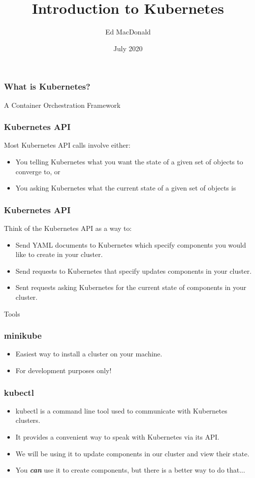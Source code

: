 \documentclass{beamer}
\title[Kubernetes]{Introduction to Kubernetes}
\author{Ed MacDonald}
\institute{Solution Street}
\date{July 2020}
\begin{document}
\frame{\titlepage}

\begin{frame}
\frametitle{What is Kubernetes?}
A Container Orchestration Framework
\end{frame}

\begin{frame}
\frametitle{Kubernetes API}
Most Kubernetes API calls involve either:
\begin{itemize}
    \item You telling Kubernetes what you want the state of a given set of objects to converge to, or
    \item You asking Kubernetes what the current state of a given set of objects is
\end{itemize}
\end{frame}

\begin{frame}
\frametitle{Kubernetes API}
Think of the Kubernetes API as a way to:
\begin{itemize}
    \item Send YAML documents to Kubernetes which specify components you would like to create in your cluster.
    \item Send requests to Kubernetes that specify updates components in your cluster.
    \item Sent requests asking Kubernetes for the current state of components in your cluster.
\end{itemize}
\end{frame}

\begin{frame}
    \begin{center}
        \Huge Tools
    \end{center}
\end{frame}

\begin{frame}
    \frametitle{minikube\footnotemark}
    \begin{itemize}
        \item Easiest way to install a cluster on your machine.
        \item For development purposes only!
    \end{itemize}
\end{frame}

\begin{frame}
\frametitle{kubectl\footnotemark}
\begin{itemize}
\item kubectl is a command line tool used to communicate with Kubernetes clusters.
\item It provides a convenient way to speak with Kubernetes via its API.
\item We will be using it to update components in our cluster and view their state.
\item You \textbf{\textit{can}} use it to create components, but there is a better way to do that...
\end{itemize}
\end{frame}
\end{document}
